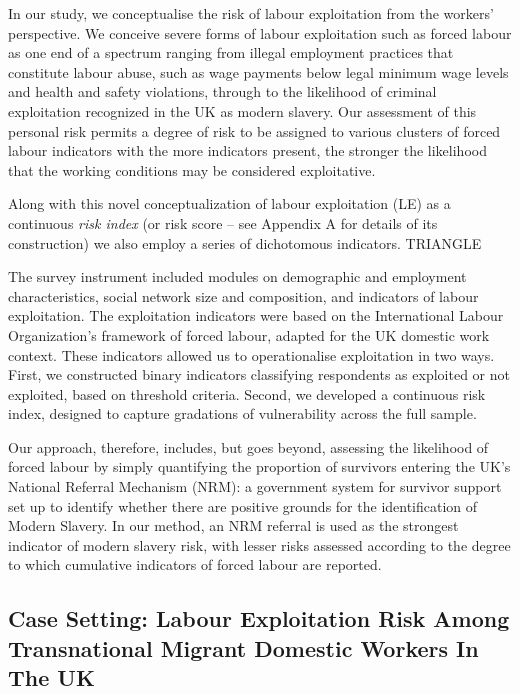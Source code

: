 \documentclass[
  12pt,
  letterpaper,
  DIV=11,
  numbers=noendperiod]{scrartcl}
\theoremstyle{plain}
\theoremstyle{definition}
\begin{document}
In our study, we conceptualise the risk of labour exploitation from the
workers' perspective. We conceive severe forms of labour exploitation
such as forced labour as one end of a spectrum ranging from illegal
employment practices that constitute labour abuse, such as wage payments
below legal minimum wage levels and health and safety violations,
through to the likelihood of criminal exploitation recognized in the UK
as modern slavery. Our assessment of this personal risk permits a degree
of risk to be assigned to various clusters of forced labour indicators
with the more indicators present, the stronger the likelihood that the
working conditions may be considered exploitative.

Along with this novel conceptualization of labour exploitation (LE) as a
continuous \emph{risk index} (or risk score -- see Appendix A for
details of its construction) we also employ a series of dichotomous
indicators. TRIANGLE

The survey instrument included modules on demographic and employment
characteristics, social network size and composition, and indicators of
labour exploitation. The exploitation indicators were based on the
International Labour Organization's framework of forced labour, adapted
for the UK domestic work context. These indicators allowed us to
operationalise exploitation in two ways. First, we constructed binary
indicators classifying respondents as exploited or not exploited, based
on threshold criteria. Second, we developed a continuous risk index,
designed to capture gradations of vulnerability across the full sample.

Our approach, therefore, includes, but goes beyond, assessing the
likelihood of forced labour by simply quantifying the proportion of
survivors entering the UK's National Referral Mechanism (NRM): a
government system for survivor support set up to identify whether there
are positive grounds for the identification of Modern Slavery. In our
method, an NRM referral is used as the strongest indicator of modern
slavery risk, with lesser risks assessed according to the degree to
which cumulative indicators of forced labour are reported.

\subsection{Case Setting: Labour Exploitation Risk Among Transnational
Migrant Domestic Workers In The
UK}\label{case-setting-labour-exploitation-risk-among-transnational-migrant-domestic-workers-in-the-uk}
\end{document}
